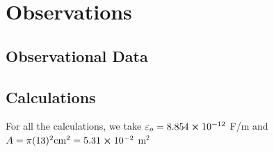 \section{Observations}

\subsection*{Observational Data}



            


        

        

        


\subsection*{Calculations}
    For all the calculations, we take $\varepsilon_o = 8.854\cross10^{-12}$ F/m and $A = \pi(13)^2 \text{cm}^2 = 5.31\cross10^{-2}$ m$^2$\\

